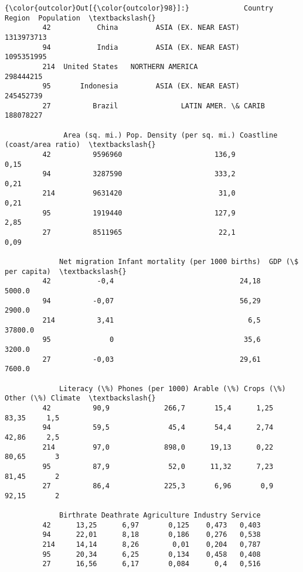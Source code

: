\documentclass[11pt]{article}
\begin{document}
\begin{Verbatim}[commandchars=\\\{\}]
{\color{outcolor}Out[{\color{outcolor}98}]:}             Country                               Region  Population  \textbackslash{}
         42           China         ASIA (EX. NEAR EAST)           1313973713   
         94           India         ASIA (EX. NEAR EAST)           1095351995   
         214  United States   NORTHERN AMERICA                      298444215   
         95       Indonesia         ASIA (EX. NEAR EAST)            245452739   
         27          Brazil               LATIN AMER. \& CARIB       188078227   
         
              Area (sq. mi.) Pop. Density (per sq. mi.) Coastline (coast/area ratio)  \textbackslash{}
         42          9596960                      136,9                         0,15   
         94          3287590                      333,2                         0,21   
         214         9631420                       31,0                         0,21   
         95          1919440                      127,9                         2,85   
         27          8511965                       22,1                         0,09   
         
             Net migration Infant mortality (per 1000 births)  GDP (\$ per capita)  \textbackslash{}
         42           -0,4                              24,18              5000.0   
         94          -0,07                              56,29              2900.0   
         214          3,41                                6,5             37800.0   
         95              0                               35,6              3200.0   
         27          -0,03                              29,61              7600.0   
         
             Literacy (\%) Phones (per 1000) Arable (\%) Crops (\%) Other (\%) Climate  \textbackslash{}
         42          90,9             266,7       15,4      1,25     83,35     1,5   
         94          59,5              45,4       54,4      2,74     42,86     2,5   
         214         97,0             898,0      19,13      0,22     80,65       3   
         95          87,9              52,0      11,32      7,23     81,45       2   
         27          86,4             225,3       6,96       0,9     92,15       2   
         
             Birthrate Deathrate Agriculture Industry Service  
         42      13,25      6,97       0,125    0,473   0,403  
         94      22,01      8,18       0,186    0,276   0,538  
         214     14,14      8,26        0,01    0,204   0,787  
         95      20,34      6,25       0,134    0,458   0,408  
         27      16,56      6,17       0,084      0,4   0,516  
\end{Verbatim}
            
\end{document}
